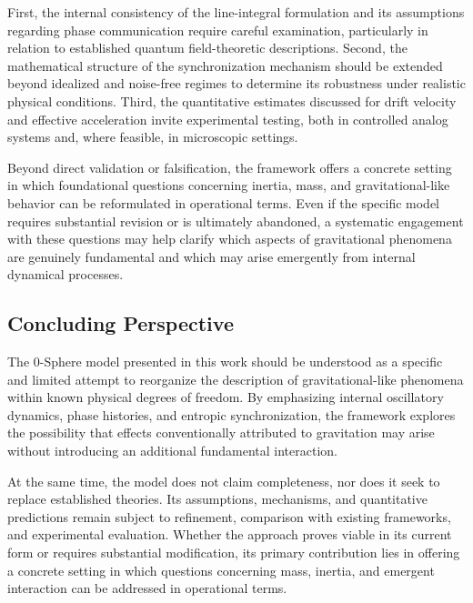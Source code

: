 \documentclass[12pt,letterpaper]{article}
\begin{document}
First, the internal consistency of the line-integral formulation and its assumptions regarding phase communication require careful examination, particularly in relation to established quantum field-theoretic descriptions. Second, the mathematical structure of the synchronization mechanism should be extended beyond idealized and noise-free regimes to determine its robustness under realistic physical conditions. Third, the quantitative estimates discussed for drift velocity and effective acceleration invite experimental testing, both in controlled analog systems and, where feasible, in microscopic settings.

Beyond direct validation or falsification, the framework offers a concrete setting in which foundational questions concerning inertia, mass, and gravitational-like behavior can be reformulated in operational terms. Even if the specific model requires substantial revision or is ultimately abandoned, a systematic engagement with these questions may help clarify which aspects of gravitational phenomena are genuinely fundamental and which may arise emergently from internal dynamical processes.


\subsection{Concluding Perspective}
\label{subsec:concluding_perspective}

The 0-Sphere model presented in this work should be understood as a specific and limited attempt to reorganize the description of gravitational-like phenomena within known physical degrees of freedom. By emphasizing internal oscillatory dynamics, phase histories, and entropic synchronization, the framework explores the possibility that effects conventionally attributed to gravitation may arise without introducing an additional fundamental interaction.

At the same time, the model does not claim completeness, nor does it seek to replace established theories. Its assumptions, mechanisms, and quantitative predictions remain subject to refinement, comparison with existing frameworks, and experimental evaluation. Whether the approach proves viable in its current form or requires substantial modification, its primary contribution lies in offering a concrete setting in which questions concerning mass, inertia, and emergent interaction can be addressed in operational terms.
\end{document}
